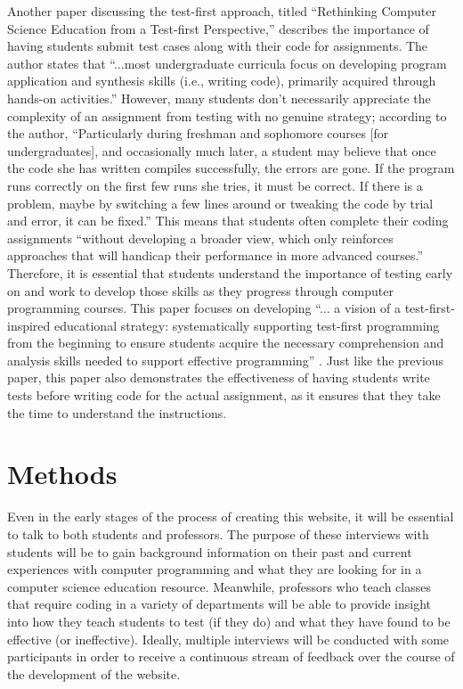 \documentclass[10pt,twocolumn]{article}
\begin{document}
Another paper discussing the test-first approach, titled “Rethinking Computer Science Education from a Test-first Perspective,” describes the importance of having students submit test cases along with their code for assignments. The author states that “...most undergraduate curricula focus on developing program application and synthesis skills (i.e., writing code), primarily acquired through hands-on activities.” However, many students don’t necessarily appreciate the complexity of an assignment from testing with no genuine strategy; according to the author, “Particularly during freshman and sophomore courses [for undergraduates], and occasionally much later, a student may believe that once the code she has written compiles successfully, the errors are gone. If the program runs correctly on the first few runs she tries, it must be correct. If there is a problem, maybe by switching a few lines around or tweaking the code by trial and error, it can be fixed.” This means that students often complete their coding assignments “without developing a broader view, which only reinforces approaches that will handicap their performance in more advanced courses.” Therefore, it is essential that students understand the importance of testing early on and work to develop those skills as they progress through computer programming courses. This paper focuses on developing “... a vision of a test-first-inspired educational strategy: systematically supporting test-first programming from the beginning to ensure students acquire the necessary comprehension and analysis skills needed to support effective programming” \cite{Test-first}. Just like the previous paper, this paper also demonstrates the effectiveness of having students write tests before writing code for the actual assignment, as it ensures that they take the time to understand the instructions.

\section{Methods}

Even in the early stages of the process of creating this website, it will be essential to talk to both students and professors. The purpose of these interviews with students will be to gain background information on their past and current experiences with computer programming and what they are looking for in a computer science education resource. Meanwhile, professors who teach classes that require coding in a variety of departments will be able to provide insight into how they teach students to test (if they do) and what they have found to be effective (or ineffective). Ideally, multiple interviews will be conducted with some participants in order to receive a continuous stream of feedback over the course of the development of the website.
\end{document}
